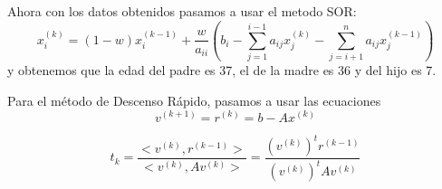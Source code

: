 \begin{frame}

    \begin{solution}
      Ahora con los datos obtenidos pasamos a usar el metodo SOR:
      \begin{equation*}
          x_{i}^{(k)}=(1-w)x_{i}^{(k-1)}+\frac{w}{a_{ii}}(b_{i}-\sum\limits_{j=1}^{i-1}a_{ij}x_{j}^{(k)} -\sum\limits_{j=i+1}^{n}a_{ij}x_{j}^{(k-1)})
      \end{equation*}
      y obtenemos que la edad del padre es 37, el de la madre es 36 y del hijo es 7.
    \end{solution}
    
\end{frame}

\begin{frame}
    Para el método de Descenso Rápido, pasamos a usar las ecuaciones\\
    \begin{equation*}
        v^{(k+1)}=r^{(k)}=b-Ax^{(k)} 
    \end{equation*}
     
     \begin{equation*}
         t_{k}=\frac{<v^{(k)},r^{(k-1)}>}{<v^{(k)},Av^{(k)}>}=\frac{(v^{(k)})^{t}r^{(k-1)}}{(v^{(k)})^{t}Av^{(k)}}
    \end{equation*}
    

\end{frame}
